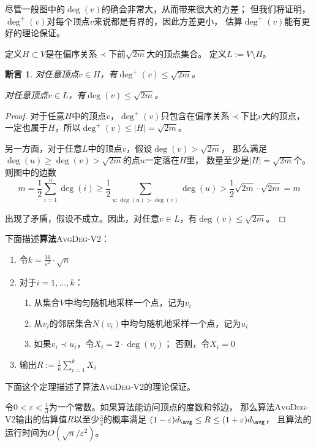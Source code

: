 \documentclass[lang=cn,newtx,10pt,scheme=chinese,chinesefont=nofont,citestyle=gb7714-2015, bibstyle=gb7714-2015]{elegantbook}
\newtheorem{claim}{断言}[chapter]   %
\begin{document}
\begin{refsection}
尽管一般图中的$\deg(v)$的确会非常大，从而带来很大的方差；
但我们将证明，$\deg^+(v)$对每个顶点$v$来说都是有界的，因此方差更小，
估算$\deg^+(v)$能有更好的理论保证。

\begin{definition}
    定义$H\subset V$是在偏序关系$\prec$下前$\sqrt{2m}$大的顶点集合。
    定义$L:=V\setminus H$。
\end{definition}

\begin{claim}\label{claim:LH-bound}
    对任意顶点$v\in H$，有$\deg^+(v)\le\sqrt{2m}$。

    对任意顶点$v\in L$，有$\deg(v)\le\sqrt{2m}$。
\end{claim}
\begin{proof}
    对于任意$H$中的顶点$v$，$\deg^+(v)$只包含在偏序关系$\prec$下比$v$大的顶点，
    一定也属于$H$，所以$\deg^+(v)\le|H|=\sqrt{2m}$。

    另一方面，对于任意$L$中的顶点$v$，假设$\deg(v)>\sqrt{2m}$，
    那么满足$\deg(u)\ge\deg(v)>\sqrt{2m}$的点$u$一定落在$H$里，
    数量至少是$|H|=\sqrt{2m}$个。则图中的边数
    \[
    m=\frac{1}{2}\sum_{i=1}^n\deg(i)
    \ge\frac{1}{2}\sum_{u:\deg(u)>\deg(v)}\deg(u)
    >\frac{1}{2}\sqrt{2m}\cdot\sqrt{2m} =m
    \]

    出现了矛盾，假设不成立。因此，对任意$v\in L$，有$\deg(v)\le\sqrt{2m}$。
\end{proof}

下面描述\textbf{算法}\textsc{AvgDeg-V2}：
\begin{enumerate}
    \item 令$k=\frac{16}{\varepsilon^2}\cdot\sqrt{n}$
    \item 对于$i=1,\dots,k$：
    \begin{enumerate}
        \item[2.1] 从集合$V$中均匀随机地采样一个点，记为$v_i$
        \item[2.2] 从$v_i$的邻居集合$N(v_i)$中均匀随机地采样一个点，记为$u_i$
        \item[2.3] 如果$v_i\prec u_i$，令$X_i=2\cdot\deg(v_i)$；
        否则，令$X_i=0$
    \end{enumerate}
    \item 输出$R:=\frac{1}{k}\sum_{i=1}^kX_i$
\end{enumerate}

下面这个定理描述了算法\textsc{AvgDeg-V2}的理论保证。

\begin{theorem}
    令$0<\varepsilon<\frac{1}{3}$为一个常数。如果算法能访问顶点的度数和邻边，
    那么算法\textsc{AvgDeg-V2}输出的估算值$R$以至少$\frac{3}{4}$的概率满足
    $(1-\varepsilon)d_\avg\le R\le(1+\varepsilon)d_\avg$，
    且算法的运行时间为$O(\sqrt{n}/\varepsilon^2)$。
\end{theorem}


\end{refsection}
\end{document}
